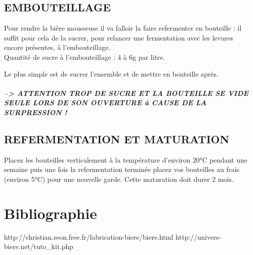 \documentclass{report}
\begin{document}
\section{EMBOUTEILLAGE}

Pour rendre la bière mousseuse il va falloir la faire refermenter en bouteille : il suffit pour cela de la sucrer, pour relancer une fermentation avec les levures encore présentes, à l'embouteillage.\\

Quantité de sucre à l'embouteillage : 4 à 6g par litre.

Le plus simple est de sucrer l'ensemble et de mettre en bouteille après.

\paragraph{--> ATTENTION TROP DE SUCRE ET LA BOUTEILLE SE VIDE SEULE LORS DE SON OUVERTURE à CAUSE DE LA SURPRESSION !}

\section{REFERMENTATION ET MATURATION }

Placez les bouteilles verticalement à la température d'environ 20°C pendant une semaine puis une fois la refermentation terminée placez vos bouteilles au frais (environ 5°C) pour une nouvelle garde. Cette maturation doit durer 2 mois.



\chapter*{Bibliographie}
http://christian.seon.free.fr/fabrication-biere/biere.html
http://univers-biere.net/tuto_kit.php
\end{document}
